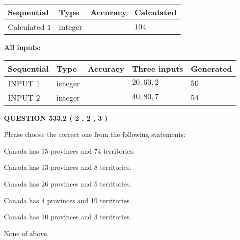 \documentclass[12pt]{article}
\begin{document}
   
   
   
\noindent{}
   
   
  
  
\noindent\begin{tabular}{|l|l|l|l|}
\hline
 Sequential & Type & Accuracy & Calculated \\ 
\hline
 
 
  Calculated $  1 $ & integer &  & 
  $ 104 $ 
 \\  \hline  
 \end{tabular}
   
   
   
   
\noindent\vspace{0.1in}\hspace{-0.08in} {\textbf{\Large{All inputs: }}}
   
   
  
  
\noindent\begin{tabular}{|l|l|l|l|l|}
\hline
 Sequential & Type & Accuracy & Three inputs & Generated \\ 
\hline
 
 
  INPUT $  1 $ & integer &  & $
 20
 , 
 60
 , 
 2
 $ & $ 50 $ 
 \\  \hline  
 
 
  INPUT $  2 $ & integer &  & $
 40
 , 
 80
 , 
 7
 $ & $ 54 $ 
 \\  \hline  
 \end{tabular}
   
   
  
\vspace{0.2in}
  
{\textbf{\Large{QUESTION
533.2 
 ( 2 , 2 , 3 )
}}}
  
  
Please choose the correct one from the following statements:
 
 
Canada has  15 provinces and  74 territories.
 
 
Canada has  13 provinces and  8 territories.
 
 
Canada has  26 provinces and  5 territories.
 
 
Canada has   4 provinces and  19 territories.
 
 
Canada has 10  provinces and 3 territories.
 
 
 None of above.
 
\end{document}
